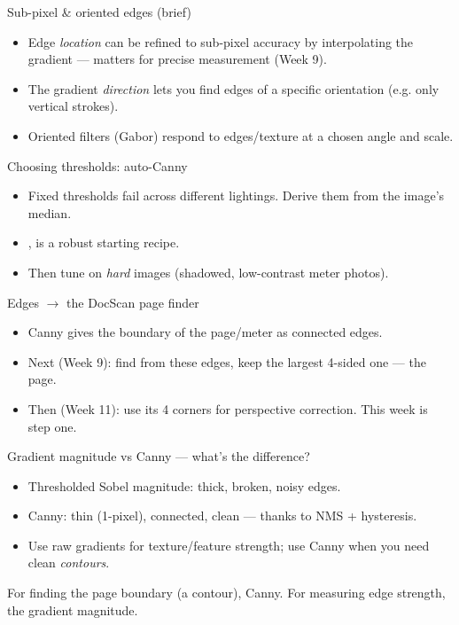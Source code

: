 \documentclass[10pt,aspectratio=169]{beamer}
\begin{document}
\begin{frame}{Sub-pixel \& oriented edges (brief)}
  \begin{itemize}
    \item Edge \emph{location} can be refined to sub-pixel accuracy by interpolating the gradient — matters for precise measurement (Week 9).
    \item The gradient \emph{direction} lets you find edges of a specific orientation (e.g. only vertical strokes).
    \item Oriented filters (Gabor) respond to edges/texture at a chosen angle and scale.
  \end{itemize}
\end{frame}

\begin{frame}{Choosing thresholds: auto-Canny}
  \begin{itemize}
    \item Fixed thresholds fail across different lightings. Derive them from the image's median.
    \item {},  is a robust starting recipe.
    \item Then tune on \emph{hard} images (shadowed, low-contrast meter photos).
  \end{itemize}
\end{frame}

\begin{frame}{Edges $\rightarrow$ the DocScan page finder}
  \begin{itemize}
    \item Canny gives the boundary of the page/meter as connected edges.
    \item Next (Week 9): find  from these edges, keep the largest 4-sided one — the page.
    \item Then (Week 11): use its 4 corners for perspective correction. This week is step one.
  \end{itemize}
\end{frame}

\begin{frame}{Gradient magnitude vs Canny — what's the difference?}
  \begin{itemize}
    \item Thresholded Sobel magnitude: thick, broken, noisy edges.
    \item Canny: thin (1-pixel), connected, clean — thanks to NMS + hysteresis.
    \item Use raw gradients for texture/feature strength; use Canny when you need clean \emph{contours}.
  \end{itemize}
  \begin{goodbox}
    For finding the page boundary (a contour), Canny. For measuring edge strength, the gradient magnitude.
  \end{goodbox}
\end{frame}
\end{document}
